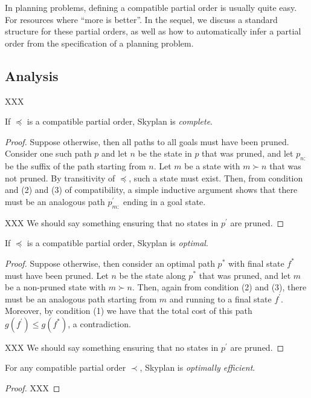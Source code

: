 \documentclass[letterpaper]{article}
\theoremstyle{plain} \newtheorem{theorem}{Theorem} \newtheorem{proposition}{Proposition} \newtheorem{lemma}{Lemma}
\theoremstyle{definition} \newtheorem{definition}{Definition} \newtheorem{conjecture}{Conjecture} \newtheorem*{example}{Example}
\theoremstyle{remark} \newtheorem*{remark}{Remark} \newtheorem*{note}{Note} \newtheorem{case}{Case}
\begin{document}
In planning problems, defining a compatible partial order is usually quite easy. For
resources where ``more is better''. In the sequel, we discuss a standard structure
for these partial orders, as well as how to automatically infer a partial order
from the specification of a planning problem.

\subsection{Analysis}

XXX

\begin{claim}{}\label{clm-complete}
   If $\preceq$ is a compatible partial order, Skyplan
is \emph{complete}.
\end{claim}
\begin{proof} Suppose otherwise, then all paths to all goals must
have been pruned. Consider one such path $p$ and let $n$ be the
state in $p$ that was pruned, and let $p_{n:}$ be the suffix of the
path starting from $n$. Let $m$ be a state with $m \succ n$ that was
not pruned.  By transitivity of $\preceq$, such a state must exist.
Then, from condition and (2) and (3) of compatibility, a simple
inductive argument shows that there must be an analogous path 
$p^\prime_{m:}$ ending in a goal state.

  XXX We should say something ensuring that no states in $p^\prime$ are pruned.
\end{proof}
  
\begin{claim}{}\label{clm-optimal}
   If $\preceq$ is a compatible partial order, Skyplan
is \emph{optimal}.
\end{claim}
\begin{proof} Suppose otherwise, then consider an optimal path $p^*$ with final state $f^*$
  must have been pruned. Let $n$ be the state along $p^*$ that
  was pruned, and let $m$ be a non-pruned state with $m \succ n$.
  Then, again from condition (2) and (3), there must be an analogous path
  starting from $m$ and running to a final state $f^\prime$. Moreover, by condition (1)
  we have that the total cost of this path $g(f^\prime) \le g(f^*)$, a contradiction.

  XXX We should say something ensuring that no states in $p^\prime$ are pruned.
\end{proof}



\begin{claim}{}\label{clm-optimally-efficient}
For any compatible partial order $\prec$, Skyplan is \emph{optimally efficient}.
\end{claim}
\begin{proof} XXX \end{proof}
\end{document}
